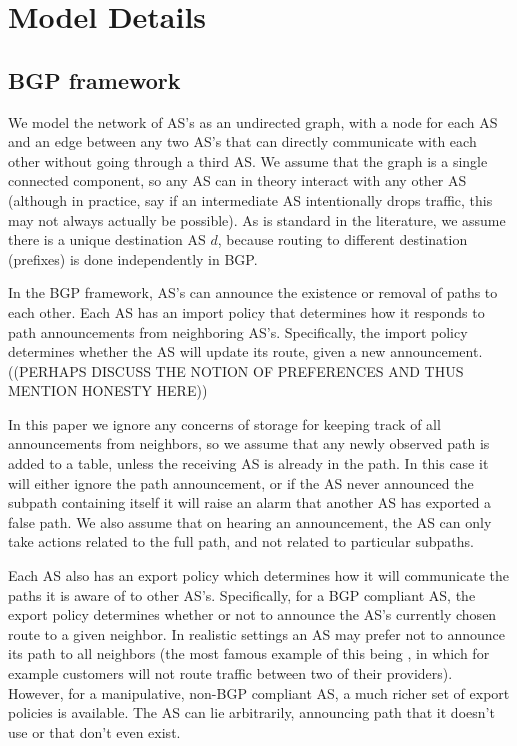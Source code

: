 \documentclass[10pt]{article}
\begin{document}
\section{Model Details}
  \subsection{BGP framework}
    We model the network of AS's as an undirected graph, with a node for each AS
    and an edge between any two AS's that can directly communicate with each other
    without going through a third AS. We assume that the graph is a single
    connected component, so any AS can in theory interact with any other AS
    (although in practice, say if an intermediate AS intentionally drops traffic,
    this may not always actually be possible).
    As is standard in the literature, we assume there is a unique destination AS
    $d$, because routing to different destination (prefixes) is done
    independently in BGP.

    In the BGP framework, AS's can announce the
    existence or removal of paths to each other.
    Each AS has an import policy that
    determines how it responds to path announcements from neighboring AS's.
    Specifically, the import policy determines whether the AS will update
    its route, given a new announcement.
    ((PERHAPS DISCUSS THE NOTION OF PREFERENCES AND THUS MENTION HONESTY HERE))

    In this paper we ignore any concerns of storage for keeping track of all
    announcements from neighbors, so we assume that any newly observed path is
    added to a table, unless the receiving AS is already in the path.
    In this case
    it will either ignore the path announcement, or if the AS never announced the
    subpath containing itself it will raise an alarm that another AS has exported
    a false path.
    We also assume that on hearing an announcement, the AS can only
    take actions related to the full path, and not related to particular subpaths.

    Each AS also has an export policy which determines how it will communicate the
    paths it is aware of to other AS's.
    Specifically, for a BGP compliant AS, the export policy determines
    whether or not to announce the AS's currently chosen route to a given neighbor.
    In realistic settings an AS may prefer not to announce its path to all neighbors
    (the most famous example of this being \cite{GaoRexford},
    in which for example customers will not route traffic
    between two of their providers).
    However, for a manipulative, non-BGP compliant AS,
    a much richer set of export policies is available.
    The AS can lie arbitrarily, announcing path that it doesn't use
    or that don't even exist.
\end{document}
